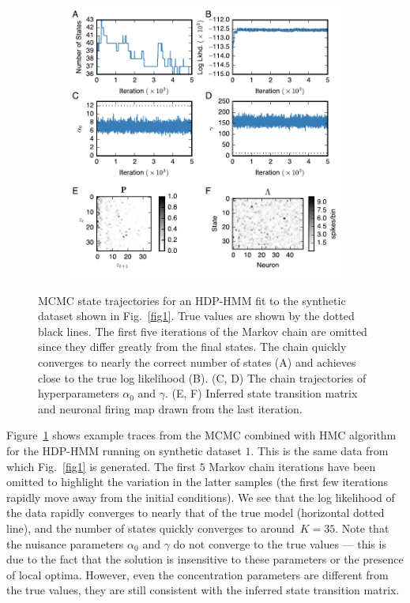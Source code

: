  
\begin{figure}[t!]
  \centering
  \begin{subfigure}[t]{5in}
    \includegraphics[width=\textwidth]{figures/ch7/Fig2.pdf}
  \end{subfigure}
  \caption[Inference results for an HDP-HMM fit to synthetic
    data]{MCMC state trajectories for an HDP-HMM fit to the synthetic
    dataset shown in Fig.~\ref{fig1}. True values are shown by the
    dotted black lines. The first five iterations of the Markov chain
    are omitted since they differ greatly from the final states. The
    chain quickly converges to nearly the correct number of states (A)
    and achieves close to the true log likelihood (B). (C, D) The
    chain trajectories of hyperparameters $\alpha_0$ and $\gamma$. (E,
    F) Inferred state transition matrix and neuronal firing map drawn
    from the last iteration.  }
  \label{fig2}
\end{figure}

Figure~\ref{fig2} shows example traces from the MCMC combined with HMC
algorithm for the HDP-HMM running on synthetic dataset $1$. This is the
same data from which Fig.~\ref{fig1} is generated. The first $5$ Markov
chain iterations have been omitted to highlight the variation in the
latter samples (the first few iterations rapidly move away from the
initial conditions). We see that the log likelihood of the data
rapidly converges to nearly that of the true model (horizontal dotted
line), and the number of states quickly converges to around~$K=35$.
Note that the nuisance parameters $\alpha_0$ and $\gamma$ do not
converge to the true values --- this is due to the fact that the
solution is insensitive to these parameters or the presence of local
optima.  However, even the concentration parameters are different from
the true values, they are still consistent with the inferred state
transition matrix.

